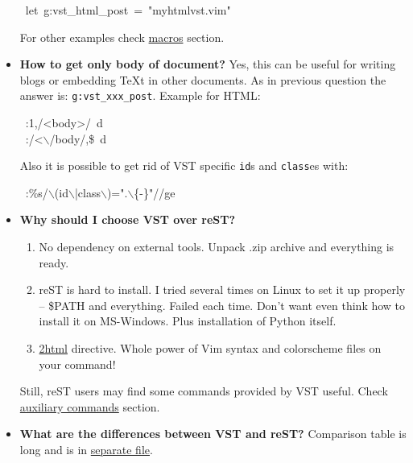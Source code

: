 \documentclass[12pt]{article}
\begin{document}
\begin{itemize}
\begin{ttfamily}\begin{flushleft}
\mbox{~let~g:vst\_html\_post~=~"myhtmlvst.vim"}\\
\end{flushleft}\end{ttfamily}

 For other examples check \href{\#lmacros}{macros} section.

\item
\textbf{How to get only body of document?} Yes, this can be useful for writing blogs
or embedding \TeX{}t in other documents. As in previous question the answer is:
\texttt{g:vst\_xxx\_post}. Example for HTML:

\begin{ttfamily}\begin{flushleft}
\mbox{~:1,/<body>/~d}\\
\mbox{~:/<$\backslash$/body/,\$~d}\\
\end{flushleft}\end{ttfamily}

 Also it is possible to get rid of VST specific \texttt{id}s and \texttt{class}es
 with:

\begin{ttfamily}\begin{flushleft}
\mbox{~:\%s/$\backslash$(id$\backslash$|class$\backslash$)=".$\backslash$\{-\}"//ge}\\
\end{flushleft}\end{ttfamily}

\item
\textbf{Why should I choose VST over reST?}

 \begin{enumerate}[label=\arabic*.]
\item
No dependency on external tools. Unpack .zip archive and everything is ready.

\item
reST is hard to install. I tried several times on Linux to set it up
properly -- \$PATH and everything. Failed each time. Don't want even
think how to install it on MS-Windows. Plus installation of Python
itself.

\item
\href{\#l2html}{2html} directive. Whole power of Vim syntax and colorscheme files on
your command!
 \end{enumerate}

 Still, reST users may find some commands provided by VST useful. Check
 \href{\#lauxiliary-commands}{auxiliary commands} section.

\item
\textbf{What are the differences between VST and reST?} Comparison table is long
and is in \href{http://skawina.eu.org/mikolaj/restdiff.html}{separate file}.
\end{itemize}
\hypertarget{lchangelog}{}
\end{document}
